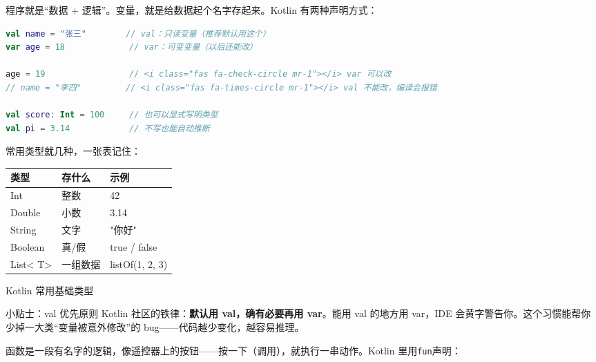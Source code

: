 


程序就是“数据 + 逻辑”。变量，就是给数据起个名字存起来。Kotlin 有两种声明方式：

\begin{lstlisting}[language=Kotlin]
val name = "张三"        // val：只读变量（推荐默认用这个）
var age = 18             // var：可变变量（以后还能改）

age = 19                 // <i class="fas fa-check-circle mr-1"></i> var 可以改
// name = "李四"         // <i class="fas fa-times-circle mr-1"></i> val 不能改，编译会报错

val score: Int = 100     // 也可以显式写明类型
val pi = 3.14            // 不写也能自动推断
\end{lstlisting}

常用类型就几种，一张表记住：

\begin{center}
\begin{tabularx}{\linewidth}{|X|X|X|}
\hline
\textbf{类型} & \textbf{存什么} & \textbf{示例} \tabularnewline
\hline
Int & 整数 & 42 \tabularnewline
Double & 小数 & 3.14 \tabularnewline
String & 文字 & "你好" \tabularnewline
Boolean & 真/假 & true / false \tabularnewline
List< T> & 一组数据 & listOf(1, 2, 3) \tabularnewline
\hline
\end{tabularx}
\end{center}

\begin{center}\small\color{gray}Kotlin 常用基础类型\end{center}

\begin{tcbinfo}{小贴士：val 优先原则}
Kotlin 社区的铁律：\textbf{默认用 val，确有必要再用 var}。能用 val 的地方用 var，IDE 会黄字警告你。这个习惯能帮你少掉一大类“变量被意外修改”的 bug——代码越少变化，越容易推理。

\end{tcbinfo}


函数是一段有名字的逻辑，像遥控器上的按钮——按一下（调用），就执行一串动作。Kotlin 里用\texttt{fun}声明：

